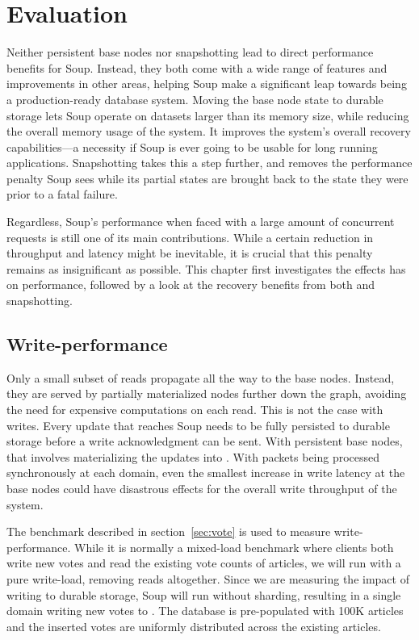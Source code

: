 \chapter{Evaluation}\label{chap:evaluation}

Neither persistent base nodes nor snapshotting lead to direct performance
benefits for Soup. Instead, they both come with a wide range of features and
improvements in other areas, helping Soup make a significant leap towards being
a production-ready database system. Moving the base node state to durable
storage lets Soup operate on datasets larger than its memory size, while
reducing the overall memory usage of the system. It improves the system's
overall recovery capabilities---a necessity if Soup is ever going to be usable
for long running applications. Snapshotting takes this a step further, and
removes the performance penalty Soup sees while its partial states are brought
back to the state they were prior to a fatal failure.

Regardless, Soup's performance when faced with a large amount of concurrent
requests is still one of its main contributions. While a certain reduction in
throughput and latency might be inevitable, it is crucial that this penalty
remains as insignificant as possible. This chapter first investigates the
effects  has on performance, followed by a look at the
recovery benefits from both  and snapshotting.

\newpage

\section{Write-performance}

Only a small subset of reads propagate all the way to the base nodes. Instead,
they are served by partially materialized nodes further down the graph, avoiding
the need for expensive computations on each read. This is not the case with
writes. Every update that reaches Soup needs to be fully persisted to durable
storage before a write acknowledgment can be sent. With persistent base nodes,
that involves materializing the updates into . With
packets being processed synchronously at each domain, even the smallest increase
in write latency at the base nodes could have disastrous effects for the overall
write throughput of the system.

The  benchmark described in section~\ref{sec:vote} is used to measure
write-performance. While it is normally a mixed-load benchmark where clients
both write new votes and read the existing vote counts of articles, we will run
 with a pure write-load, removing reads altogether. Since we are
measuring the impact of writing to durable storage, Soup will run without
sharding, resulting in a single domain writing new votes to
. The database is pre-populated with 100K articles and the
inserted votes are uniformly distributed across the existing articles.

